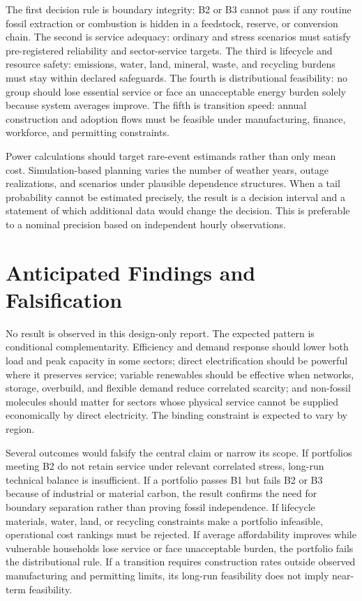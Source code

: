 \documentclass[conference]{IEEEtran}
\begin{document}
The first decision rule is boundary integrity: B2 or B3 cannot pass if any routine fossil extraction or combustion is hidden in a feedstock, reserve, or conversion chain. The second is service adequacy: ordinary and stress scenarios must satisfy pre-registered reliability and sector-service targets. The third is lifecycle and resource safety: emissions, water, land, mineral, waste, and recycling burdens must stay within declared safeguards. The fourth is distributional feasibility: no group should lose essential service or face an unacceptable energy burden solely because system averages improve. The fifth is transition speed: annual construction and adoption flows must be feasible under manufacturing, finance, workforce, and permitting constraints.

Power calculations should target rare-event estimands rather than only mean cost. Simulation-based planning varies the number of weather years, outage realizations, and scenarios under plausible dependence structures. When a tail probability cannot be estimated precisely, the result is a decision interval and a statement of which additional data would change the decision. This is preferable to a nominal precision based on independent hourly observations.

\section{Anticipated Findings and Falsification}
\label{sec:anticipated}
No result is observed in this design-only report. The expected pattern is conditional complementarity. Efficiency and demand response should lower both load and peak capacity in some sectors; direct electrification should be powerful where it preserves service; variable renewables should be effective when networks, storage, overbuild, and flexible demand reduce correlated scarcity; and non-fossil molecules should matter for sectors whose physical service cannot be supplied economically by direct electricity. The binding constraint is expected to vary by region.

Several outcomes would falsify the central claim or narrow its scope. If portfolios meeting B2 do not retain service under relevant correlated stress, long-run technical balance is insufficient. If a portfolio passes B1 but fails B2 or B3 because of industrial or material carbon, the result confirms the need for boundary separation rather than proving fossil independence. If lifecycle materials, water, land, or recycling constraints make a portfolio infeasible, operational cost rankings must be rejected. If average affordability improves while vulnerable households lose service or face unacceptable burden, the portfolio fails the distributional rule. If a transition requires construction rates outside observed manufacturing and permitting limits, its long-run feasibility does not imply near-term feasibility.
\end{document}
